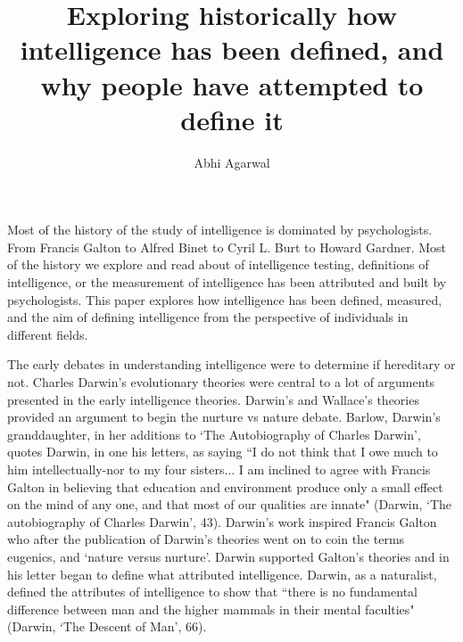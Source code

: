 \documentclass[11pt, oneside]{article}
\title{Exploring historically how intelligence has been defined, and why people have attempted to define it\vspace{-0.4cm}}
\author{Abhi Agarwal\vspace{-1cm}}
\date{}
\begin{document}
\maketitle


\par Most of the history of the study of intelligence is dominated by psychologists. From Francis Galton to Alfred Binet to Cyril L. Burt to Howard Gardner. Most of the history we explore and read about of intelligence testing, definitions of intelligence, or the measurement of intelligence has been attributed and built by psychologists. This paper explores how intelligence has been defined, measured, and the aim of defining intelligence from the perspective of individuals in different fields.



\par The early debates in understanding intelligence were to determine if hereditary or not. Charles Darwin's evolutionary theories were central to a lot of arguments presented in the early intelligence theories. Darwin's and Wallace's theories provided an argument to begin the nurture vs nature debate. Barlow, Darwin's granddaughter, in her additions to `The Autobiography of Charles Darwin', quotes Darwin, in one his letters, as saying ``I do not think that I owe much to him intellectually-nor to my four sisters... I am inclined to agree with Francis Galton in believing that education and environment produce only a small effect on the mind of any one, and that most of our qualities are innate" (Darwin, `The autobiography of Charles Darwin', 43). Darwin's work inspired Francis Galton who after the publication of Darwin's theories went on to coin the terms eugenics, and `nature versus nurture'. Darwin supported Galton's theories and in his letter began to define what attributed intelligence. Darwin, as a naturalist, defined the attributes of intelligence to show that ``there is no fundamental difference between man and the higher mammals in their mental faculties" (Darwin, `The Descent of Man', 66). 
\end{document}
